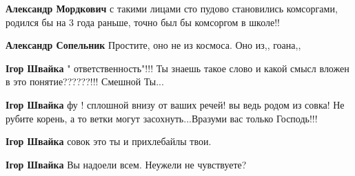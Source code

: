\begin{itemize}
\begin{itemize}
\textbf{Александр Мордкович} с такими лицами сто пудово становились комсоргами, родился бы на 3 года раньше, точно был бы комсоргом в школе!!

 
\textbf{Александр Сопельник} Простите, оно не из космоса. Оно из,, гоана,,

 
\textbf{Ігор Швайка} " ответственность"!!! Ты знаешь такое слово и какой смысл вложен в это понятие??????!!! Смешной Ты...🤣🤣🤣

 
\textbf{Ігор Швайка} фу ! сплошной внизу от ваших речей! вы ведь родом из совка! Не рубите корень, а то ветки могут засохнуть...Вразуми вас только Господь!!!

 
\textbf{Ігор Швайка} совок это ты и прихлебайлы твои.

 
\textbf{Ігор Швайка} Вы надоели всем. Неужели не чувствуете?

 

\end{itemize}
\end{itemize}
